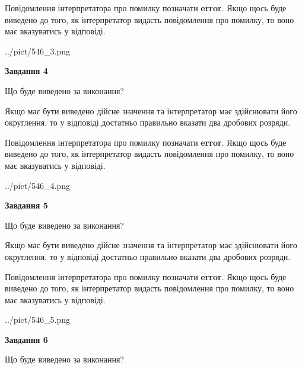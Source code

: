 \documentclass[12pt, ukrainian]{article}
\begin{document}
{\begin {Large}
Повідомлення інтерпретатора про помилку позначати \textbf{error}.
Якщо щось буде виведено до того, як інтерпретатор видасть повідомлення про помилку, 
то воно має вказуватись у відповіді. \par

\begin{center}
	{../pict/546_3.png}
\end{center}
\newpage

{\begin {center}\textbf{Завдання 4}\end {center}}\par
Що буде виведено за виконання? \par

Якщо має бути виведено дійсне значення та інтерпретатор має здійснювати його округлення, 
то у відповіді достатньо правильно вказати два дробових розряди.

Повідомлення інтерпретатора про помилку позначати \textbf{error}.
Якщо щось буде виведено до того, як інтерпретатор видасть повідомлення про помилку, 
то воно має вказуватись у відповіді. \par

\begin{center}
	{../pict/546_4.png}
\end{center}
\newpage

{\begin {center}\textbf{Завдання 5}\end {center}}\par
Що буде виведено за виконання? \par

Якщо має бути виведено дійсне значення та інтерпретатор має здійснювати його округлення, 
то у відповіді достатньо правильно вказати два дробових розряди.

Повідомлення інтерпретатора про помилку позначати \textbf{error}.
Якщо щось буде виведено до того, як інтерпретатор видасть повідомлення про помилку, 
то воно має вказуватись у відповіді. \par

\begin{center}
	{../pict/546_5.png}
\end{center}
\newpage

{\begin {center}\textbf{Завдання 6}\end {center}}\par
Що буде виведено за виконання? \par


\end{Large}}
\end{document}
